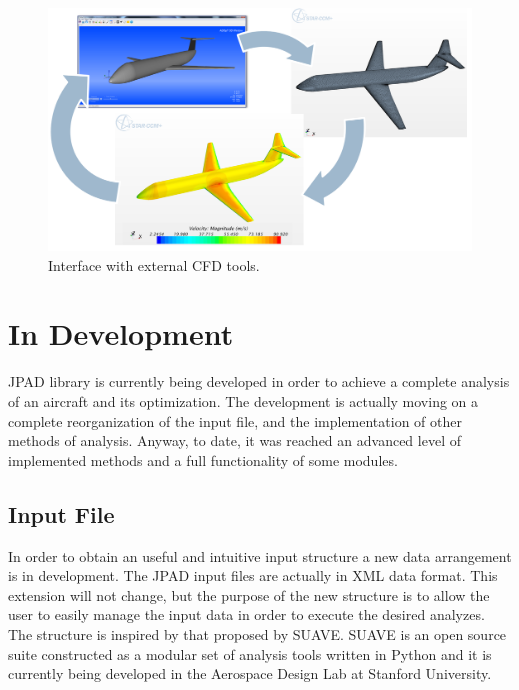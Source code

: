 \begin{figure}[H]
	\centering
		\includegraphics[width=12.9 cm]{Immagini/interface}
		\caption{Interface with external CFD tools.}
		\label{fig:badTail}
	\end{figure}
	
\section{In Development}

JPAD library is currently being developed in order to achieve a complete analysis of an aircraft and its optimization. The development is actually moving on a complete reorganization of the input file, and the implementation of other methods of analysis. Anyway, to date, it was reached an advanced level of implemented methods and a full functionality of some modules.

\subsection{Input File}

In order to obtain an useful and intuitive input structure a new data arrangement is in development. The JPAD input files are actually in XML data format. This extension will not change, but the purpose of the new structure is to allow the user to easily manage the input data in order to execute the desired analyzes.\\
The structure is inspired by that proposed by SUAVE. SUAVE is an open source suite constructed as a modular set of analysis tools written in Python and it is currently being developed in the Aerospace Design Lab at Stanford University. \cite{suave}

